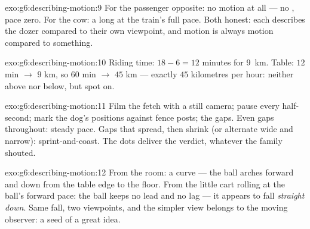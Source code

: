 \begin{solution}{exo:g6:describing-motion:9}
For the passenger opposite: no motion at all --- no ,
pace zero. For the cow: a long  at the train's
full pace. Both honest: each describes the dozer compared to their
own viewpoint, and motion is always motion compared to something.
\end{solution}

\begin{solution}{exo:g6:describing-motion:10}
Riding time: $18 - 6 = 12$ minutes for \qty{9}{km}. Table: $12$
min $\to$ $9$ km, so $60$ min $\to$ $45$ km --- exactly $45$
kilometres per hour: neither above nor below, but spot on.
\end{solution}

\begin{solution}{exo:g6:describing-motion:11}
Film the fetch with a still camera; pause every half-second; mark
the dog's positions against fence posts;  the gaps. Even
gaps throughout: steady pace. Gaps that spread, then shrink (or
alternate wide and narrow): sprint-and-coast. The dots deliver the
verdict, whatever the family shouted.
\end{solution}

\begin{solution}{exo:g6:describing-motion:12}
From the room: a curve --- the ball arches forward and down from
the table edge to the floor. From the little cart rolling at the
ball's forward pace: the ball keeps no lead and no lag --- it
appears to fall \emph{straight down}. Same fall, two viewpoints,
and the simpler view belongs to the moving observer: a seed of a
great idea.
\end{solution}


